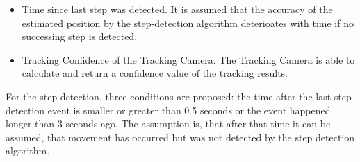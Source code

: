 \documentclass[engproc,conferenceproceedings,submit,pdftex,moreauthors]{Definitions/mdpi}
\begin{document}
\begin{itemize}
	\item Time since last step was detected. It is assumed that the accuracy of the estimated position by the step-detection algorithm deterioates with time if no successing step is detected.
	\item Tracking Confidence of the Tracking Camera. The Tracking Camera is able to calculate and return a confidence value of the tracking results. 
\end{itemize}

For the step detection, three conditions are proposed: the time after the last step detection event is smaller or greater than 0.5 seconds or the event happened longer than 3 seconds ago. The assumption is, that after that time it can be assumed, that movement has occurred but was not detected by the step detection algorithm.\\
\end{document}
